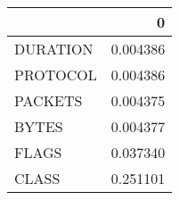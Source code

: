 \begin{tabular}{lr}
\toprule
{} &         0 \\
\midrule
DURATION &  0.004386 \\
PROTOCOL &  0.004386 \\
PACKETS  &  0.004375 \\
BYTES    &  0.004377 \\
FLAGS    &  0.037340 \\
CLASS    &  0.251101 \\
\bottomrule
\end{tabular}
